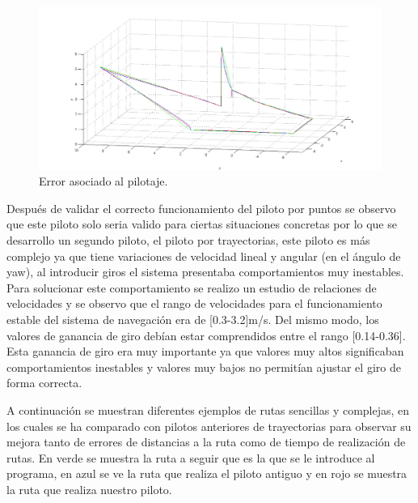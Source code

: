 \begin{figure}[H]
	\begin{center}
		\includegraphics[width=1.0\textwidth]{imag/IMG47.png}
				\caption{Error asociado al pilotaje.}
		\label{fig:Error asociado al pilotaje.}	
	\end{center}
\end{figure}

\hspace{1cm} Después de validar el correcto funcionamiento del piloto por puntos se observo que este piloto solo seria valido para ciertas situaciones concretas por lo que se desarrollo un segundo piloto, el piloto por trayectorias, este piloto es más complejo ya que tiene variaciones de velocidad lineal y angular (en el ángulo de yaw), al introducir giros el sistema presentaba comportamientos muy inestables. Para solucionar este comportamiento se realizo un estudio de relaciones de velocidades y se observo que el rango de velocidades para el funcionamiento estable del sistema de navegación era de [0.3-3.2]m/s. Del mismo modo, los valores de ganancia de giro debían estar comprendidos entre el rango [0.14-0.36]. Esta ganancia de giro era muy importante ya que valores muy altos significaban comportamientos inestables y valores muy bajos no permitían ajustar el giro de forma correcta. 

\hspace{1cm} A continuación se muestran diferentes ejemplos de rutas sencillas y complejas, en los cuales se ha comparado con pilotos anteriores de trayectorias para observar su mejora tanto de errores de distancias a la ruta como de tiempo de realización de rutas. En verde se muestra la ruta a seguir que es la que se le introduce al programa, en azul se ve la ruta que realiza el piloto antiguo y en rojo se muestra la ruta que realiza nuestro piloto.

